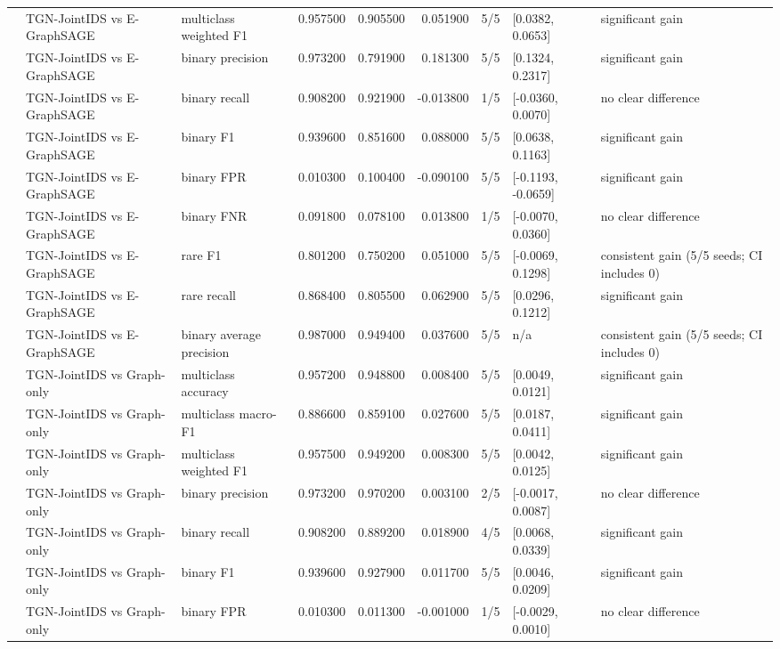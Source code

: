 \begin{table}
\begin{tabular}{lllrrrlll}
 & TGN-JointIDS vs E-GraphSAGE & multiclass weighted F1 & 0.957500 & 0.905500 & 0.051900 & 5/5 & [0.0382, 0.0653] & significant gain \\
 & TGN-JointIDS vs E-GraphSAGE & binary precision & 0.973200 & 0.791900 & 0.181300 & 5/5 & [0.1324, 0.2317] & significant gain \\
 & TGN-JointIDS vs E-GraphSAGE & binary recall & 0.908200 & 0.921900 & -0.013800 & 1/5 & [-0.0360, 0.0070] & no clear difference \\
 & TGN-JointIDS vs E-GraphSAGE & binary F1 & 0.939600 & 0.851600 & 0.088000 & 5/5 & [0.0638, 0.1163] & significant gain \\
 & TGN-JointIDS vs E-GraphSAGE & binary FPR & 0.010300 & 0.100400 & -0.090100 & 5/5 & [-0.1193, -0.0659] & significant gain \\
 & TGN-JointIDS vs E-GraphSAGE & binary FNR & 0.091800 & 0.078100 & 0.013800 & 1/5 & [-0.0070, 0.0360] & no clear difference \\
 & TGN-JointIDS vs E-GraphSAGE & rare F1 & 0.801200 & 0.750200 & 0.051000 & 5/5 & [-0.0069, 0.1298] & consistent gain (5/5 seeds; CI includes 0) \\
 & TGN-JointIDS vs E-GraphSAGE & rare recall & 0.868400 & 0.805500 & 0.062900 & 5/5 & [0.0296, 0.1212] & significant gain \\
 & TGN-JointIDS vs E-GraphSAGE & binary average precision & 0.987000 & 0.949400 & 0.037600 & 5/5 & n/a & consistent gain (5/5 seeds; CI includes 0) \\
 & TGN-JointIDS vs Graph-only & multiclass accuracy & 0.957200 & 0.948800 & 0.008400 & 5/5 & [0.0049, 0.0121] & significant gain \\
 & TGN-JointIDS vs Graph-only & multiclass macro-F1 & 0.886600 & 0.859100 & 0.027600 & 5/5 & [0.0187, 0.0411] & significant gain \\
 & TGN-JointIDS vs Graph-only & multiclass weighted F1 & 0.957500 & 0.949200 & 0.008300 & 5/5 & [0.0042, 0.0125] & significant gain \\
 & TGN-JointIDS vs Graph-only & binary precision & 0.973200 & 0.970200 & 0.003100 & 2/5 & [-0.0017, 0.0087] & no clear difference \\
 & TGN-JointIDS vs Graph-only & binary recall & 0.908200 & 0.889200 & 0.018900 & 4/5 & [0.0068, 0.0339] & significant gain \\
 & TGN-JointIDS vs Graph-only & binary F1 & 0.939600 & 0.927900 & 0.011700 & 5/5 & [0.0046, 0.0209] & significant gain \\
 & TGN-JointIDS vs Graph-only & binary FPR & 0.010300 & 0.011300 & -0.001000 & 1/5 & [-0.0029, 0.0010] & no clear difference \\

\end{tabular}
\end{table}
